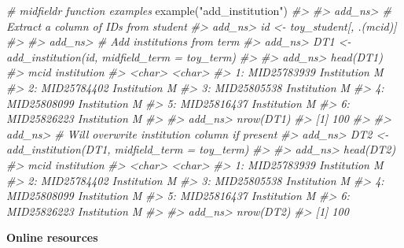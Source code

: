\documentclass[
]{book}
\newenvironment{Shaded}{\begin{snugshade}}{\end{snugshade}}
\newcommand{\CommentTok}[1]{\textcolor[rgb]{0.56,0.35,0.01}{\textit{#1}}}
\newcommand{\FunctionTok}[1]{\textcolor[rgb]{0.00,0.00,0.00}{#1}}
\newcommand{\NormalTok}[1]{#1}
\newcommand{\StringTok}[1]{\textcolor[rgb]{0.31,0.60,0.02}{#1}}
\begin{document}
\begin{Shaded}
\begin{Highlighting}[]
\CommentTok{\# midfieldr function examples}
\FunctionTok{example}\NormalTok{(}\StringTok{"add\_institution"}\NormalTok{)}
\CommentTok{\#\textgreater{} }
\CommentTok{\#\textgreater{} add\_ns\textgreater{} \# Extract a column of IDs from student}
\CommentTok{\#\textgreater{} add\_ns\textgreater{} id \textless{}{-} toy\_student[, .(mcid)]}
\CommentTok{\#\textgreater{} }
\CommentTok{\#\textgreater{} add\_ns\textgreater{} \# Add institutions from term}
\CommentTok{\#\textgreater{} add\_ns\textgreater{} DT1 \textless{}{-} add\_institution(id, midfield\_term = toy\_term)}
\CommentTok{\#\textgreater{} }
\CommentTok{\#\textgreater{} add\_ns\textgreater{} head(DT1)}
\CommentTok{\#\textgreater{}           mcid   institution}
\CommentTok{\#\textgreater{}         \textless{}char\textgreater{}        \textless{}char\textgreater{}}
\CommentTok{\#\textgreater{} 1: MID25783939 Institution M}
\CommentTok{\#\textgreater{} 2: MID25784402 Institution M}
\CommentTok{\#\textgreater{} 3: MID25805538 Institution M}
\CommentTok{\#\textgreater{} 4: MID25808099 Institution M}
\CommentTok{\#\textgreater{} 5: MID25816437 Institution M}
\CommentTok{\#\textgreater{} 6: MID25826223 Institution M}
\CommentTok{\#\textgreater{} }
\CommentTok{\#\textgreater{} add\_ns\textgreater{} nrow(DT1)}
\CommentTok{\#\textgreater{} [1] 100}
\CommentTok{\#\textgreater{} }
\CommentTok{\#\textgreater{} add\_ns\textgreater{} \# Will overwrite institution column if present}
\CommentTok{\#\textgreater{} add\_ns\textgreater{} DT2 \textless{}{-} add\_institution(DT1, midfield\_term = toy\_term)}
\CommentTok{\#\textgreater{} }
\CommentTok{\#\textgreater{} add\_ns\textgreater{} head(DT2)}
\CommentTok{\#\textgreater{}           mcid   institution}
\CommentTok{\#\textgreater{}         \textless{}char\textgreater{}        \textless{}char\textgreater{}}
\CommentTok{\#\textgreater{} 1: MID25783939 Institution M}
\CommentTok{\#\textgreater{} 2: MID25784402 Institution M}
\CommentTok{\#\textgreater{} 3: MID25805538 Institution M}
\CommentTok{\#\textgreater{} 4: MID25808099 Institution M}
\CommentTok{\#\textgreater{} 5: MID25816437 Institution M}
\CommentTok{\#\textgreater{} 6: MID25826223 Institution M}
\CommentTok{\#\textgreater{} }
\CommentTok{\#\textgreater{} add\_ns\textgreater{} nrow(DT2)}
\CommentTok{\#\textgreater{} [1] 100}
\end{Highlighting}
\end{Shaded}

\textbf{Online resources}
\end{document}
